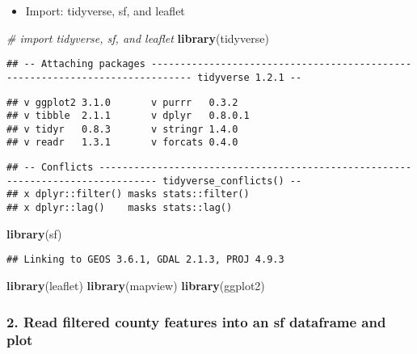 \documentclass[]{article}
\newenvironment{Shaded}{\begin{snugshade}}{\end{snugshade}}
\newcommand{\KeywordTok}[1]{\textcolor[rgb]{0.13,0.29,0.53}{\textbf{#1}}}
\newcommand{\CommentTok}[1]{\textcolor[rgb]{0.56,0.35,0.01}{\textit{#1}}}
\newcommand{\NormalTok}[1]{#1}
\providecommand{\tightlist}{%
  \setlength{\itemsep}{0pt}\setlength{\parskip}{0pt}}
\begin{document}
\begin{itemize}
\tightlist
\item
  Import: tidyverse, sf, and leaflet
\end{itemize}

\begin{Shaded}
\begin{Highlighting}[]
\CommentTok{# import tidyverse, sf, and leaflet}
\KeywordTok{library}\NormalTok{(tidyverse)}
\end{Highlighting}
\end{Shaded}

\begin{verbatim}
## -- Attaching packages ----------------------------------------------------------------------------- tidyverse 1.2.1 --
\end{verbatim}

\begin{verbatim}
## v ggplot2 3.1.0       v purrr   0.3.2  
## v tibble  2.1.1       v dplyr   0.8.0.1
## v tidyr   0.8.3       v stringr 1.4.0  
## v readr   1.3.1       v forcats 0.4.0
\end{verbatim}

\begin{verbatim}
## -- Conflicts -------------------------------------------------------------------------------- tidyverse_conflicts() --
## x dplyr::filter() masks stats::filter()
## x dplyr::lag()    masks stats::lag()
\end{verbatim}

\begin{Shaded}
\begin{Highlighting}[]
\KeywordTok{library}\NormalTok{(sf)}
\end{Highlighting}
\end{Shaded}

\begin{verbatim}
## Linking to GEOS 3.6.1, GDAL 2.1.3, PROJ 4.9.3
\end{verbatim}

\begin{Shaded}
\begin{Highlighting}[]
\KeywordTok{library}\NormalTok{(leaflet)}
\KeywordTok{library}\NormalTok{(mapview)}
\KeywordTok{library}\NormalTok{(ggplot2)}
\end{Highlighting}
\end{Shaded}

\subsubsection{2. Read filtered county features into an sf dataframe and
plot}\label{read-filtered-county-features-into-an-sf-dataframe-and-plot}
\end{document}
